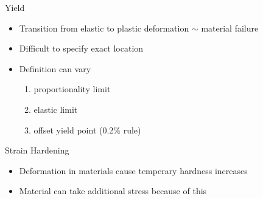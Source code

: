 \documentclass[10pt, svgnames]{beamer}
\begin{document}
\begin{frame}[label={sec:orgc734d38}]{Yield}
\begin{itemize}
\item Transition from elastic to plastic deformation \(\sim\) material
failure

\item Difficult to specify exact location

\item Definition can vary

\begin{enumerate}
\item proportionality limit

\item elastic limit

\item offset yield point (0.2\% rule)
\end{enumerate}
\end{itemize}
\end{frame}

\begin{frame}[label={sec:org21f3e94}]{Strain Hardening}
\begin{itemize}
\item Deformation in materials cause temperary hardness increases

\item Material can take additional stress because of this
\end{itemize}
\end{frame}
\end{document}
